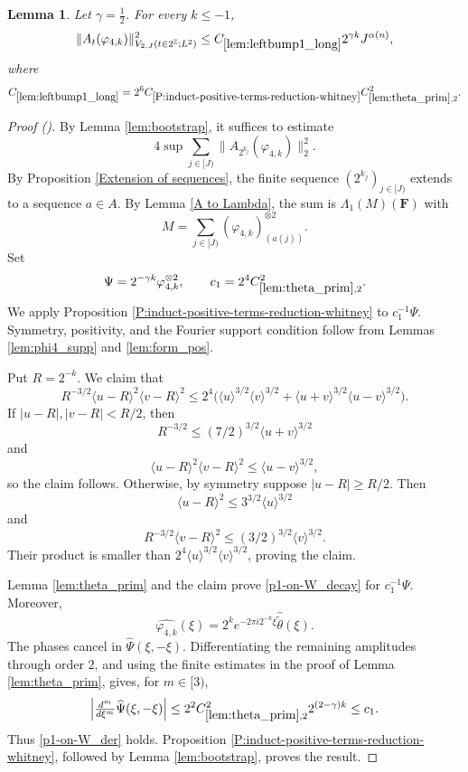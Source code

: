 \documentclass[12pt,reqno]{amsart}
\newcommand{\auto}{{({\tiny\faCar})}}
\theoremstyle{plain}
\newtheorem{lemma}[theorem]{Lemma}
\numberwithin{equation}{section}
\theoremstyle{remark}
\newcommand{\uses}[1]{}
\newcommand{\usesdefs}[1]{}
\newcommand{\F}{\mathbf{F}}
\begin{document}
\begin{lemma}\label{lem:leftbump1_long}\uses{lem:bootstrap,Extension of sequences,A to Lambda,lem:theta_prim,P:induct-positive-terms-reduction-whitney,lem:phi4_supp,lem:form_pos}\usesdefs{A_def,bracket bump,normalized function tuples,auto:prism-form-definition,multiplicatively spaced monotone sequences,defn:window based bump functions}
Let $\gamma=\frac12$. For every $k\le-1$,
\begin{equation}\label{auto:left-bump-one-long-bound}
\|A_t(\varphi_{4,k})\|_{V_{2,J}(t\in2^\mathbb Z;L^2)}^2
\le C_{\ref{lem:leftbump1_long}}2^{\gamma k}J^{\alpha(n)},
\end{equation}
where
\begin{equation}\label{auto:left-bump-one-long-constant-definition}
C_{\ref{lem:leftbump1_long}}
=2^6C_{\ref{P:induct-positive-terms-reduction-whitney}}
C_{\ref{lem:theta_prim},2}^2.
\end{equation}
\end{lemma}

\begin{proof}[Proof \auto]
By Lemma \ref{lem:bootstrap}, it suffices to estimate
\[
4\sup\sum_{j\in[J)}\|A_{2^{k_j}}(\varphi_{4,k})\|_2^2.
\]
By Proposition \ref{Extension of sequences}, the finite sequence $(2^{k_j})_{j\in[J)}$ extends to a sequence $a\in A$. By Lemma \ref{A to Lambda}, the sum is $\Lambda_1(M)(\F)$ with
\[
M=\sum_{j\in[J)}(\varphi_{4,k})_{(a(j))}^{\otimes2}.
\]
Set
\[
\Psi=2^{-\gamma k}\varphi_{4,k}^{\otimes2},
\qquad
c_1=2^4C_{\ref{lem:theta_prim},2}^2.
\]
We apply Proposition \ref{P:induct-positive-terms-reduction-whitney} to $c_1^{-1}\Psi$. Symmetry, positivity, and the Fourier support condition follow from Lemmas \ref{lem:phi4_supp} and \ref{lem:form_pos}.

Put $R=2^{-k}$. We claim that
\[
R^{-3/2}\langle u-R\rangle^2\langle v-R\rangle^2
\le2^4\bigl(
\langle u\rangle^{3/2}\langle v\rangle^{3/2}
+\langle u+v\rangle^{3/2}\langle u-v\rangle^{3/2}
\bigr).
\]
If $|u-R|,|v-R|<R/2$, then
\[
R^{-3/2}\le(7/2)^{3/2}\langle u+v\rangle^{3/2}
\]
and
\[
\langle u-R\rangle^2\langle v-R\rangle^2
\le\langle u-v\rangle^{3/2},
\]
so the claim follows. Otherwise, by symmetry suppose $|u-R|\ge R/2$. Then
\[
\langle u-R\rangle^2\le3^{3/2}\langle u\rangle^{3/2}
\]
and
\[
R^{-3/2}\langle v-R\rangle^2
\le(3/2)^{3/2}\langle v\rangle^{3/2}.
\]
Their product is smaller than $2^4\langle u\rangle^{3/2}\langle v\rangle^{3/2}$, proving the claim.

Lemma \ref{lem:theta_prim} and the claim prove \eqref{p1-on-W_decay} for $c_1^{-1}\Psi$. Moreover,
\[
\widehat{\varphi_{4,k}}(\xi)
=2^ke^{-2\pi i2^{-k}\xi}\widehat{\widetilde\theta}(\xi).
\]
The phases cancel in $\widehat\Psi(\xi,-\xi)$. Differentiating the remaining amplitudes through order $2$, and using the finite estimates in the proof of Lemma \ref{lem:theta_prim}, gives, for $m\in[3)$,
\[
\left|\tfrac{d^m}{d\xi^m}\widehat\Psi(\xi,-\xi)\right|
\le2^2C_{\ref{lem:theta_prim},2}^2 2^{(2-\gamma)k}
\le c_1.
\]
Thus \eqref{p1-on-W_der} holds. Proposition \ref{P:induct-positive-terms-reduction-whitney}, followed by Lemma \ref{lem:bootstrap}, proves the result.
\end{proof}
\end{document}
